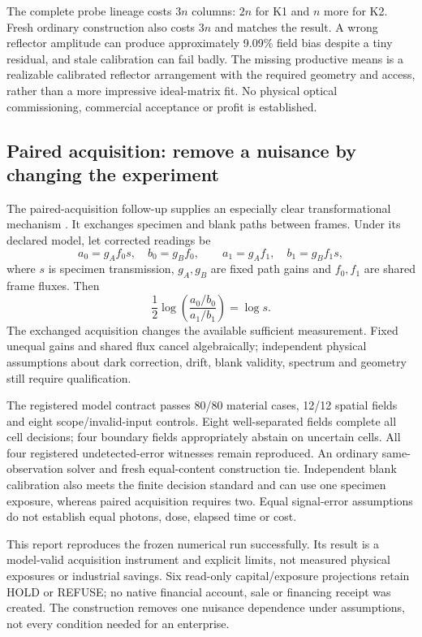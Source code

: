 \documentclass[11pt,letterpaper]{article}
\begin{document}
The complete probe lineage costs $3n$ columns: $2n$ for K1 and $n$ more for K2. Fresh ordinary construction also costs $3n$ and matches the result. A wrong reflector amplitude can produce approximately 9.09\% field bias despite a tiny residual, and stale calibration can fail badly. The missing productive means is a realizable calibrated reflector arrangement with the required geometry and access, rather than a more impressive ideal-matrix fit. No physical optical commissioning, commercial acceptance or profit is established.

\subsection{Paired acquisition: remove a nuisance by changing the experiment}
The paired-acquisition follow-up supplies an especially clear transformational mechanism \cite{paired}. It exchanges specimen and blank paths between frames. Under its declared model, let corrected readings be
\[
a_0=g_A f_0 s,\quad b_0=g_B f_0,\qquad
a_1=g_A f_1,\quad b_1=g_B f_1 s,
\]
where $s$ is specimen transmission, $g_A,g_B$ are fixed path gains and $f_0,f_1$ are shared frame fluxes. Then
\begin{equation}
\frac{1}{2}\log\!\left(\frac{a_0/b_0}{a_1/b_1}\right)=\log s.
\end{equation}
The exchanged acquisition changes the available sufficient measurement. Fixed unequal gains and shared flux cancel algebraically; independent physical assumptions about dark correction, drift, blank validity, spectrum and geometry still require qualification.

The registered model contract passes 80/80 material cases, 12/12 spatial fields and eight scope/invalid-input controls. Eight well-separated fields complete all cell decisions; four boundary fields appropriately abstain on uncertain cells. All four registered undetected-error witnesses remain reproduced. An ordinary same-observation solver and fresh equal-content construction tie. Independent blank calibration also meets the finite decision standard and can use one specimen exposure, whereas paired acquisition requires two. Equal signal-error assumptions do not establish equal photons, dose, elapsed time or cost.

This report reproduces the frozen numerical run successfully. Its result is a model-valid acquisition instrument and explicit limits, not measured physical exposures or industrial savings. Six read-only capital/exposure projections retain HOLD or REFUSE; no native financial account, sale or financing receipt was created. The construction removes one nuisance dependence under assumptions, not every condition needed for an enterprise.
\end{document}
